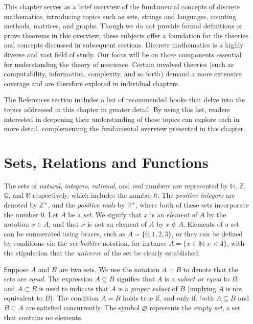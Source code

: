 This chapter serves as a brief overview of the fundamental concepts of discrete mathematics, introducing topics such as sets, strings and languages, counting methods, matrices, and graphs. Though we do not provide formal definitions or prove theorems in this overview, these subjects offer a foundation for the theories and concepts discussed in subsequent sections. Discrete mathematics is a highly diverse and vast field of study. Our focus will be on those components essential for understanding the theory of nescience. Certain involved theories (such as computability, information, complexity, and so forth) demand a more extensive coverage and are therefore explored in individual chapters.

The References section includes a list of recommended books that delve into the topics addressed in this chapter in greater detail. By using this list, readers interested in deepening their understanding of these topics can explore each in more detail, complementing the fundamental overview presented in this chapter.


%
%

\section{Sets, Relations and Functions}
\label{sec:sets}

The sets of \emph{natural}, \emph{integers}, \emph{rational}, and \emph{real} numbers are represented by $\mathbb{N}$, $\mathbb{Z}$, $\mathbb{Q}$, and $\mathbb{R}$ respectively, which includes the number $0$. The \emph{positive integers} are denoted by $\mathbb{Z}^+$, and the \emph{positive reals} by $\mathbb{R}^+$, where both of these sets incorporate the number $0$. Let $A$ be a \emph{set}. We signify that $x$ is an \emph{element} of $A$ by the notation $x\in A$, and that $x$ is not an element of $A$ by $x \notin A$. Elements of a set can be enumerated using braces, such as $A = \{0, 1, 2, 3\}$, or they can be defined by conditions via the \emph{set-builder} notation, for instance $A = \{x \in \mathbb{N} : x < 4\}$, with the stipulation that the \emph{universe} of the set be clearly established.

Suppose $A$ and $B$ are two sets. We use the notation $A = B$ to denote that the sets are \emph{equal}. The expression $A \subseteq B$ signifies that $A$ is a \emph{subset or equal} to $B$, and $A \subset B$ is used to indicate that $A$ is a \emph{proper subset} of $B$ (implying $A$ is not equivalent to $B$). The condition $A = B$ holds true if, and only if, both $A \subseteq B$ and $B \subseteq A$ are satisfied concurrently. The symbol $\varnothing$ represents the \emph{empty set}, a set that contains no elements.

